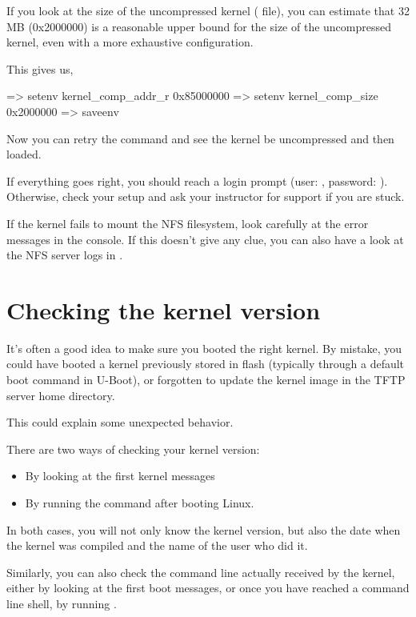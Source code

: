 If you look at the size of the uncompressed kernel ( file),
you can estimate that 32 MB (0x2000000) is a reasonable upper bound
for the size of the uncompressed kernel, even with a more exhaustive
configuration.

This gives us,

\begin{ubootinput}
=> setenv kernel_comp_addr_r 0x85000000
=> setenv kernel_comp_size 0x2000000
=> saveenv
\end{ubootinput}

Now you can retry the  command and see the kernel be uncompressed
and then loaded.

If everything goes right, you should reach a login prompt (user:
, password: ). Otherwise, check your setup and
ask your instructor for support if you are stuck.

If the kernel fails to mount the NFS filesystem, look carefully at the
error messages in the console. If this doesn't give any clue, you can
also have a look at the NFS server logs in .

\section{Checking the kernel version}

It's often a good idea to make sure you booted the right kernel.
By mistake, you could have booted a kernel previously stored in flash
(typically through a default boot command in U-Boot), or forgotten to
update the kernel image in the TFTP server home directory.

This could explain some unexpected behavior.

There are two ways of checking your kernel version:
\begin{itemize}
\item By looking at the first kernel messages
\item By running the  command after booting Linux.
\end{itemize}

In both cases, you will not only know the kernel version, but also
the date when the kernel was compiled and the name of the user who
did it.

Similarly, you can also check the command line actually received by
the kernel, either by looking at the first boot messages, or once you
have reached a command line shell, by running .

